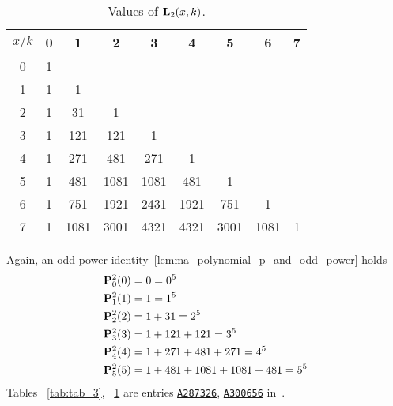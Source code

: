 \begin{table}[H]
    \begin{tabular}{c|cccccccc}
        $x/k$ & 0 & 1    & 2    & 3    & 4    & 5    & 6    & 7 \\ [3px]
        \hline
        0     & 1 &      &      &      &      &      &      &   \\
        1     & 1 & 1    &      &      &      &      &      &   \\
        2     & 1 & 31   & 1    &      &      &      &      &   \\
        3     & 1 & 121  & 121  & 1    &      &      &      &   \\
        4     & 1 & 271  & 481  & 271  & 1    &      &      &   \\
        5     & 1 & 481  & 1081 & 1081 & 481  & 1    &      &   \\
        6     & 1 & 751  & 1921 & 2431 & 1921 & 751  & 1    &   \\
        7     & 1 & 1081 & 3001 & 4321 & 4321 & 3001 & 1081 & 1
    \end{tabular}
    \caption{Values of ${\mathbf{L}}\sb{2}(x,k)$.}
    \label{tab:tab_4}
\end{table}
Again, an odd-power identity~\ref{lemma_polynomial_p_and_odd_power} holds
\begin{equation*}
    \begin{split}
        {\mathbf{P}}\sp{2} \sb{0}(0) &= 0 = 0^5 \\
        {\mathbf{P}}\sp{2} \sb{1}(1) &= 1 = 1^5 \\
        {\mathbf{P}}\sp{2} \sb{2}(2) &= 1+31 = 2^5 \\
        {\mathbf{P}}\sp{2} \sb{3}(3) &= 1+121+121 = 3^5 \\
        {\mathbf{P}}\sp{2} \sb{4}(4) &= 1+271+481+271 = 4^5 \\
        {\mathbf{P}}\sp{2} \sb{5}(5) &= 1+481+1081+1081+481 = 5^5
    \end{split}
\end{equation*}
Tables ~\ref{tab:tab_3}, ~\ref{tab:tab_4} are entries \href{https://oeis.org/A287326}{\texttt{A287326}},
\href{https://oeis.org/A300656}{\texttt{A300656}} in~\cite{Sloane_theencyclopedia}.